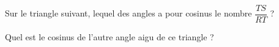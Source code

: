 
\begin{exercice}\label{exo2smath-0234}

    Sur le triangle suivant, lequel des angles a pour cosinus le nombre \( \dfrac{ TS }{ RT }\) ?

\begin{center}
    
\end{center}

Quel est le cosinus de l'autre angle aigu de ce triangle ?

\end{exercice}
